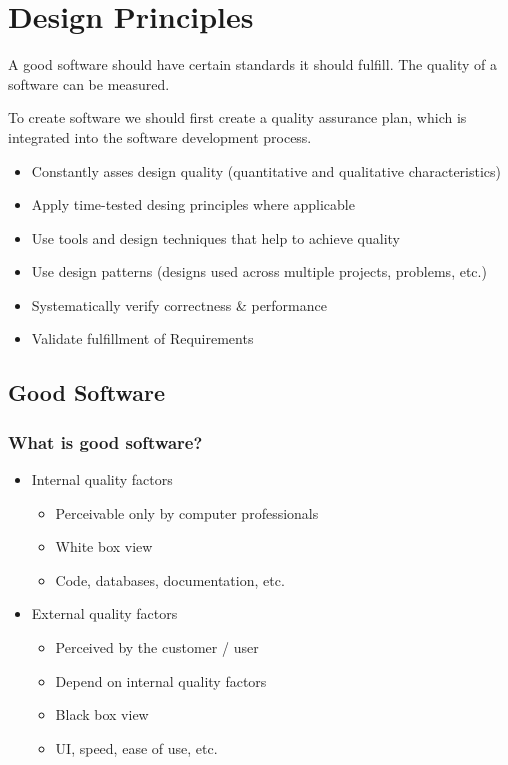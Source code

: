 \documentclass[
../../Software_Engineering_Summary.tex,
]
{subfiles}
\begin{document}
\section{Design Principles}
A good software should have certain standards it should fulfill. The quality of a software can be measured.

\begin{defbox}
    To create software we should first create a quality assurance plan, which is integrated into the software development process.

    \begin{itemize}
        \item Constantly asses design quality (quantitative and qualitative characteristics)
        \item Apply time-tested desing principles where applicable
        \item Use tools and design techniques that help to achieve quality
        \item Use design patterns (designs used across multiple projects, problems, etc.)
        \item Systematically verify correctness \& performance
        \item Validate fulfillment of Requirements
    \end{itemize}
\end{defbox}

\subsection{Good Software}
\subsubsection*{What is good software?}
    \begin{itemize}
        \item Internal quality factors
        \begin{itemize}
            \item Perceivable only by computer professionals 
            \item White box view
            \item Code, databases, documentation, etc.
        \end{itemize}
        \item External quality factors
        \begin{itemize}
            \item Perceived by the customer / user
            \item Depend on internal quality factors
            \item Black box view
            \item UI, speed, ease of use, etc.
        \end{itemize}
    \end{itemize}
\end{document}
